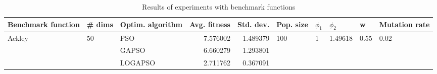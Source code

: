 \begin{table}
\centering
\caption{Results of experiments with benchmark functions}
\begin{tabular}{lllrrlllll}
\toprule
     Benchmark function &             \# dims & Optim. algorithm &  Avg. fitness &  Std. dev. &            Pop. size &         $\phi_{1}$ &               $\phi_{2}$ &                     w &         Mutation rate \\
\midrule
\multirow{3}{*}{Ackley} & \multirow{3}{*}{50} &              PSO &      7.576002 &   1.489379 & \multirow{3}{*}{100} & \multirow{3}{*}{1} & \multirow{3}{*}{1.49618} & \multirow{3}{*}{0.55} & \multirow{3}{*}{0.02} \\
                        &                     &            GAPSO &      6.660279 &   1.293801 &                      &                    &                          &                       &                       \\
                        &                     &          LOGAPSO &      2.711762 &   0.367091 &                      &                    &                          &                       &                       \\
\bottomrule
\end{tabular}
\end{table}
